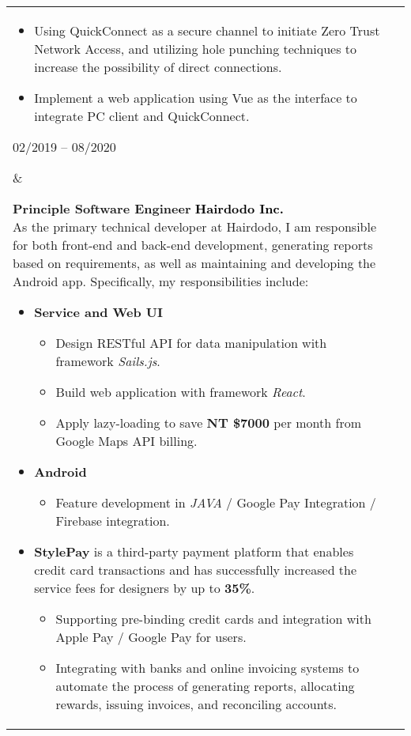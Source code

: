\documentclass[10pt,A4]{article}
\makeatletter
\newcounter{a}
\newcounter{b}
\newcounter{c}
\newenvironment{entrylist}{%
	\begin{tabular*}{\textwidth}[t]{@{\extracolsep{\fill}}ll}
	}{%
	\end{tabular*}
}
\newcommand{\entry}[4]{%
	\parbox[t]{3.5cm}{%
		#1%
	}%
	&\parbox[t]{14cm}{%
		\textbf{#2}%
		\hfill%
		{\footnotesize \textbf{\textcolor{black}{#3}}}\\%
		#4%
	}\\\\}
\makeatother
\begin{document}
\begin{entrylist}
{\begin{itemize}[leftmargin=*]
\begin{itemize}
						\item Using QuickConnect as a secure channel to initiate Zero Trust Network Access, and utilizing hole punching techniques to increase the possibility of direct connections.
						\item Implement a web application using Vue as the interface to integrate PC client and QuickConnect.
					\end{itemize}
				\end{itemize}
					}
		\entry
		{02/2019 – 08/2020}
		{Principle Software Engineer}
		{Hairdodo Inc.}
		{As the primary technical developer at Hairdodo, I am responsible for both front-end and back-end development, generating reports based on requirements, as well as maintaining and developing the Android app. Specifically, my responsibilities include:\\
		\begin{itemize}[leftmargin=*]
			\vspace{-0.5\baselineskip}
			\item \textbf{Service and Web UI}
			\begin{itemize} \normalsize
				\item Design RESTful API for data manipulation with framework \textit{Sails.js}.
				\item Build web application with framework \textit{React}.
				\item Apply lazy-loading to save \textbf{NT \$7000} per month from Google Maps API billing.
			\end{itemize}
			\item \textbf{Android}
			\begin{itemize} \normalsize
				\item Feature development in \textit{JAVA} / Google Pay Integration / Firebase integration.
			\end{itemize}
			\item \textbf{StylePay} \small is a third-party payment platform that enables credit card transactions and has successfully increased the service fees for designers by up to \textbf{35\%}.
			\begin{itemize} \normalsize
				\item Supporting pre-binding credit cards and integration with Apple Pay / Google Pay for users.
				\item Integrating with banks and online invoicing systems to automate the process of generating reports, allocating rewards, issuing invoices, and reconciling accounts.
			\end{itemize}
		\end{itemize}
		}
		\entry
		{2015 – 06/2018}
		{Software Engineer}
		{Synology Inc.}
		{
			\begin{itemize}[leftmargin=*]
				\vspace{-0.5\baselineskip}
				\item Renovate live streaming mechanism By integrating FFmpeg / WebSocket / HTML5 and MSE(Media Source Extension)
			\end{itemize}}
	\end{entrylist}
	\\\\
\end{document}

